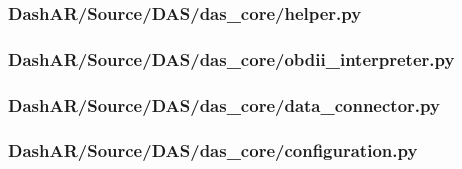             \newpage

            \subsubsection{DashAR/Source/DAS/das\_core/helper.py}
                \label{scl:dascorehelperpy}
                \begin{singlespacecode}
                    
                \end{singlespacecode}

            \newpage

            \subsubsection{DashAR/Source/DAS/das\_core/obdii\_interpreter.py}
                \label{scl:dascoreobdiipy}
                \begin{singlespacecode}
                    
                \end{singlespacecode}

            \newpage

            \subsubsection{DashAR/Source/DAS/das\_core/data\_connector.py}
                \label{scl:dascoredataconnectorpy}
                \begin{singlespacecode}
                    
                \end{singlespacecode}

            \newpage

            \subsubsection{DashAR/Source/DAS/das\_core/configuration.py}
                \label{scl:dascoreconfigpy}
                \begin{singlespacecode}
                    
                \end{singlespacecode}

            \newpage

